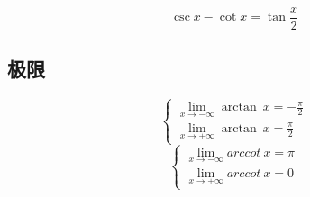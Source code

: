 \[\csc x - \cot x = \tan\dfrac{x}{2}\]


\subsection{极限}
\[\begin{cases}
    \displaystyle\lim_{x \to -\infty}\arctan\ x = -\frac{\pi}{2} \\ 
    \displaystyle\lim_{x \to +\infty}\arctan\ x = \frac{\pi}{2}
\end{cases}\]
\[\begin{cases}
    \displaystyle\lim_{x \to -\infty}arccot\ x = \pi \\ 
    \displaystyle\lim_{x \to +\infty}arccot\ x = 0
\end{cases}\]





